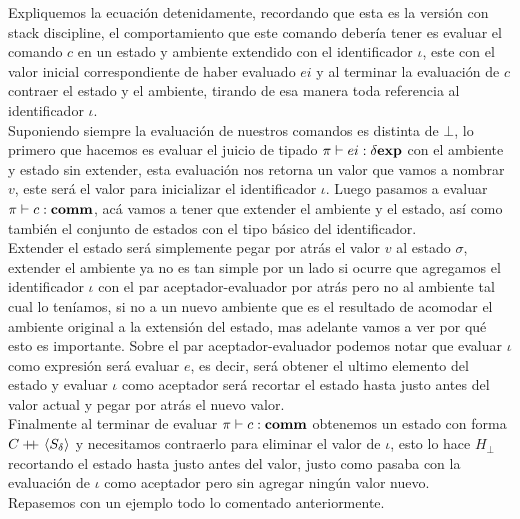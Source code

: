 \noindent
Expliquemos la ecuaci\'on detenidamente, recordando que esta es la versi\'on
con stack discipline, el comportamiento que este comando deber\'ia tener es evaluar
el comando $c$ en un estado y ambiente extendido con el identificador $\iota$, 
este con el valor inicial correspondiente de haber evaluado $ei$
y al terminar la evaluaci\'on de $c$ contraer el estado y el ambiente, tirando
de esa manera toda referencia al identificador $\iota$.\\

Suponiendo siempre la evaluaci\'on de nuestros comandos es distinta de $\bot$, 
lo primero que hacemos es evaluar el juicio de tipado $\pi \vdash ei : \delta \textbf{exp}$
con el ambiente y estado sin extender, esta evaluaci\'on nos retorna un valor
que vamos a nombrar $v$, este ser\'a el valor para inicializar el identificador $\iota$.
Luego pasamos a evaluar $\pi \vdash c : \textbf{comm}$, ac\'a vamos a tener que extender 
el ambiente y el estado, as\'i como tambi\'en el conjunto de estados con el tipo
b\'asico del identificador. \\
Extender el estado ser\'a simplemente pegar por atr\'as el valor $v$ al estado
$\sigma$, extender el ambiente ya no es tan simple por un lado si ocurre que 
agregamos el identificador $\iota$ con el par aceptador-evaluador por atr\'as
pero no al ambiente tal cual lo ten\'iamos, si no a un nuevo ambiente que es
el resultado de acomodar el ambiente original a la extensi\'on del estado, mas
adelante vamos a ver por qu\'e esto es importante. Sobre el par aceptador-evaluador
podemos notar que evaluar $\iota$ como expresi\'on ser\'a evaluar $e$, es decir,
ser\'a obtener el ultimo elemento del estado y evaluar $\iota$ como aceptador ser\'a
recortar el estado hasta justo antes del valor actual y pegar por atr\'as el nuevo
valor.\\
Finalmente al terminar de evaluar $\pi \vdash c : \textbf{comm}$ obtenemos un estado
con forma $C +\kern-1.3ex+\kern0.8ex \langle S_\delta \rangle$ y necesitamos contraerlo para eliminar
el valor de $\iota$, esto lo hace $H_\bot$ recortando el estado hasta justo antes
del valor, justo como pasaba con la evaluaci\'on de $\iota$ como aceptador pero
sin agregar ning\'un valor nuevo.\\

Repasemos con un ejemplo todo lo comentado anteriormente.\\

\

\

\

\

